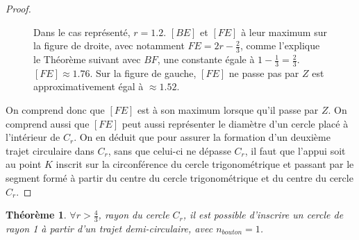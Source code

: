 \documentclass{amsart}
\newtheorem{theorem}{Théorème}[section]
\theoremstyle{definition}
\theoremstyle{remark}
\numberwithin{equation}{section}
\begin{document}
\begin{proof}
\begin{figure}[H]
    \caption{Dans le cas représenté, $r=1.2$. $[BE]$ et $[FE]$ à leur maximum sur la figure de droite, avec notamment $FE=2r-\frac{2}{3}$, comme l'explique le Théorème suivant avec $BF$, une constante égale à $1-\frac{1}{3}=\frac{2}{3}$.
      $[FE]\approx1.76$. Sur la figure de gauche, $[FE]$ ne passe pas par $Z$ est approximativement égal à $\approx1.52$.}
  \end{figure}

  On comprend donc que $[FE]$ est à son maximum lorsque qu'il passe par $Z$. On comprend aussi que $[FE]$ peut aussi représenter le diamètre d'un cercle placé à l'intérieur de $C_r$. On en déduit que pour assurer la formation d'un deuxième trajet circulaire dans $C_r$, sans
  que celui-ci ne dépasse $C_r$, il faut que l'appui soit au point $K$ inscrit sur la circonférence du cercle trigonométrique et passant par le segment formé à partir du centre du cercle trigonométrique et du centre du cercle $C_r$.
\end{proof}


\begin{theorem}
  $\forall r>\frac{4}{3}$, rayon du cercle $C_r$, il est possible d'inscrire un cercle de rayon 1 à partir d'un trajet demi-circulaire, avec $n_{bouton}=1$.
\end{theorem}
\end{document}
